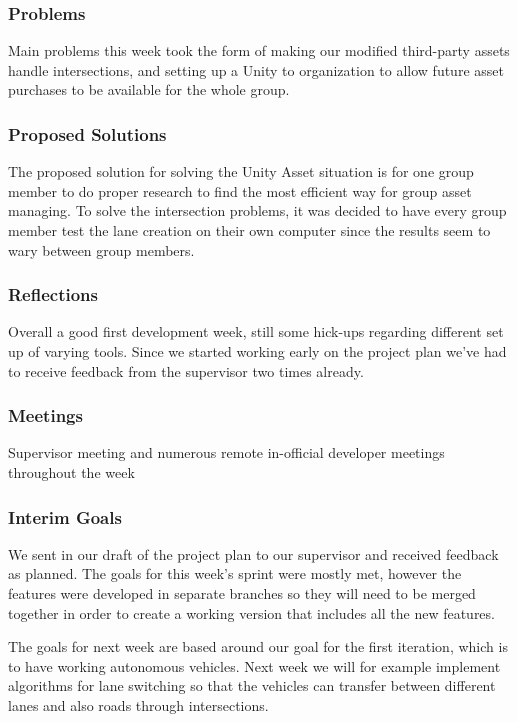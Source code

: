 \subsubsection{Problems}
    Main problems this week took the form of making our modified third-party assets handle intersections, and setting up a Unity to organization to allow future asset purchases to be available for the whole group. 

\subsubsection{Proposed Solutions}
    The proposed solution for solving the Unity Asset situation is for one group member to do proper research to find the most efficient way for group asset managing. To solve the intersection problems, it was decided to have every group member test the lane creation on their own computer since the results seem to wary between group members.

\subsubsection{Reflections}
    Overall a good first development week, still some hick-ups regarding different set up of varying tools. Since we started working early on the project plan we've had to receive feedback from the supervisor two times already. 

\subsubsection{Meetings}
    Supervisor meeting and numerous remote in-official developer meetings throughout the week

\subsubsection{Interim Goals}
    We sent in our draft of the project plan to our supervisor and received feedback as planned. The goals for this week's sprint were mostly met, however the features were developed in separate branches so they will need to be merged together in order to create a working version that includes all the new features.

    The goals for next week are based around our goal for the first iteration, which is to have working autonomous vehicles. Next week we will for example implement algorithms for lane switching so that the vehicles can transfer between different lanes and also roads through intersections.

